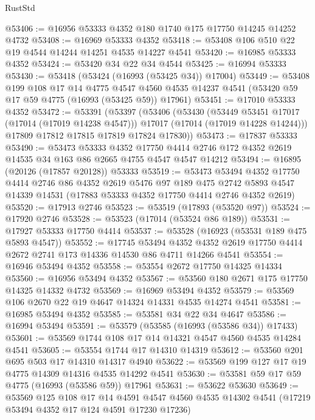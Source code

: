\begin{lexlean}{RustStd}
\begin{coremodule}
@53406 := @16956 @53333 @4352 @180 @1740 @175 @17750 @14245 @14252 @4732
@53408 := @16969 @53333 @4352
@53418 := @53408 @106 @510 @22 @19 @4544 @14244 @14251 @4535 @14227 @4541
@53420 := @16985 @53333 @4352
@53424 := @53420 @34 @22 @34 @4544
@53425 := @16994 @53333
@53430 := @53418 (@53424 (@16993 (@53425 @34)) @17004)
@53449 := @53408
    @199
    @108
    @17
    @14
    @4775
    @4547
    @4560
    @4535
    @14237
    @4541
    (@53420 @59 @17 @59 @4775 (@16993 (@53425 @59)) @17961)
@53451 := @17010 @53333 @4352
@53472 := @53391
    (@53397
      (@53406
        (@53430
          (@53449 @53451 @17017 (@17014 (@17019 @14238 @4547)))
          @17017
          (@17014 (@17019 @14228 @14244)))
        @17809
        @17812
        @17815
        @17819
        @17824
        @17830))
@53473 := @17837 @53333
@53490 := @53473
    @53333
    @4352
    @17750
    @4414
    @2746
    @172
    @4352
    @2619
    @14535
    @34
    @163
    @86
    @2665
    @4755
    @4547
    @4547
    @14212
@53494 := @16895 (@20126 (@17857 @20128)) @53333
@53519 := @53473
    @53494
    @4352
    @17750
    @4414
    @2746
    @86
    @4352
    @2619
    @5476
    @97
    @189
    @475
    @2742
    @5893
    @4547
    @14339
    @14531
    (@17883 @53333 @4352 @17750 @4414 @2746 @4352 @2619)
@53520 := @17913 @2746
@53523 := @53519 (@17893 (@53520 @97))
@53524 := @17920 @2746
@53528 := @53523 (@17014 (@53524 @86 @189))
@53531 := @17927 @53333 @17750 @4414
@53537 := @53528 (@16923 (@53531 @189 @475 @5893 @4547))
@53552 := @17745
    @53494
    @4352
    @4352
    @2619
    @17750
    @4414
    @2672
    @2741
    @173
    @14336
    @14530
    @86
    @4711
    @14266
    @4541
@53554 := @16946 @53494 @4352
@53558 := @53554 @2672 @17750 @14325 @14334
@53560 := @16956 @53494 @4352
@53567 := @53560 @180 @2671 @175 @17750 @14325 @14332 @4732
@53569 := @16969 @53494 @4352
@53579 := @53569 @106 @2670 @22 @19 @4647 @14324 @14331 @4535 @14274 @4541
@53581 := @16985 @53494 @4352
@53585 := @53581 @34 @22 @34 @4647
@53586 := @16994 @53494
@53591 := @53579 (@53585 (@16993 (@53586 @34)) @17433)
@53601 := @53569 @1744 @108 @17 @14 @14321 @4547 @4560 @4535 @14284 @4541
@53605 := @53554 @1744 @17 @14310 @14319
@53612 := @53560 @201 @695 @503 @17 @14310 @14317 @4940
@53622 := @53569 @199 @127 @17 @19 @4775 @14309 @14316 @4535 @14292 @4541
@53630 := @53581 @59 @17 @59 @4775 (@16993 (@53586 @59)) @17961
@53631 := @53622 @53630
@53649 := @53569
    @125
    @108
    @17
    @14
    @4591
    @4547
    @4560
    @4535
    @14302
    @4541
    (@17219 @53494 @4352 @17 @124 @4591 @17230 @17236)

\end{coremodule}
\end{lexlean}
